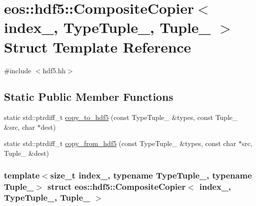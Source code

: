 \hypertarget{structeos_1_1hdf5_1_1CompositeCopier}{
\section{eos::hdf5::CompositeCopier$<$ index\_\-, TypeTuple\_\-, Tuple\_\- $>$ Struct Template Reference}
\label{structeos_1_1hdf5_1_1CompositeCopier}
}


{\ttfamily \#include $<$hdf5.hh$>$}\subsection*{Static Public Member Functions}
\begin{DoxyCompactItemize}
\item 
static std::ptrdiff\_\-t \hyperlink{structeos_1_1hdf5_1_1CompositeCopier_a22ef8fb00bdff57f9fb8c8556d45d497}{copy\_\-to\_\-hdf5} (const TypeTuple\_\- \&types, const Tuple\_\- \&src, char $\ast$dest)
\item 
static std::ptrdiff\_\-t \hyperlink{structeos_1_1hdf5_1_1CompositeCopier_ac9d6c53322b8f138c48ed5bfc951f796}{copy\_\-from\_\-hdf5} (const TypeTuple\_\- \&types, const char $\ast$src, Tuple\_\- \&dest)
\end{DoxyCompactItemize}
\subsubsection*{template$<$size\_\-t index\_\-, typename TypeTuple\_\-, typename Tuple\_\-$>$ struct eos::hdf5::CompositeCopier$<$ index\_\-, TypeTuple\_\-, Tuple\_\- $>$}



